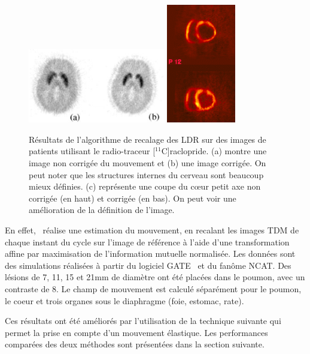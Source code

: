 \begin{figure}[h!]
	\begin{center}
		\includegraphics[width=6cm]{images/bloomfield2003design} \includegraphics[width=3cm]{images/livieratos2005rigid}
	\end{center}
	\caption[Résultats de l'algorithme de recalage des LDR sur des images de patients]{Résultats de l'algorithme de recalage des LDR sur des images de patients utilisant le radio-traceur [$^{11}$C]raclopride. (a) montre une image non corrigée du mouvement et (b) une image corrigée. On peut noter que les structures internes du cerveau sont beaucoup mieux définies. (c) représente une coupe du c\oe{}ur petit axe non corrigée (en haut) et corrigée (en bas). On peut voir une amélioration de la définition de l'image.} 
	\label{fig:ameliorationLOR}
\end{figure}
 

En effet,~\cite{lamare2007respiratory} réalise une estimation du mouvement, en recalant les images TDM de chaque instant du cycle sur l'image de référence à l'aide d'une transformation affine par maximisation de l'information mutuelle normalisée. Les données sont des simulations réalisées à partir du logiciel GATE~\cite{jan2004gate} et du fanôme NCAT. Des lésions de 7, 11, 15 et 21mm de diamètre ont été placées dans le poumon, avec un contraste de 8. Le champ de mouvement est calculé séparément pour le poumon, le coeur et trois organes sous le diaphragme (foie, estomac, rate).

Ces résultats ont été améliorés par l'utilisation de la technique suivante qui permet la prise en compte d'un mouvement élastique. Les performances comparées des deux méthodes sont présentées dans la section suivante.

